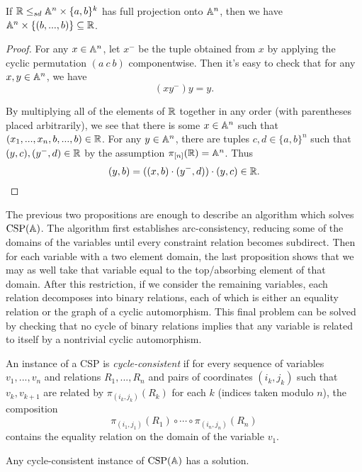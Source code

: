 \documentclass[letterpaper,11pt]{article}
\DeclareMathOperator{\CSP}{CSP}
\begin{document}
\begin{prop}\label{rps-absorb} If $\mathbb{R} \le_{sd} \mathbb{A}^n\times \{a,b\}^k$ has full projection onto $\mathbb{A}^n$, then we have $\mathbb{A}^n\times \{(b,...,b)\} \subseteq \mathbb{R}$.
\end{prop}
\begin{proof} For any $x \in \mathbb{A}^n$, let $x^-$ be the tuple obtained from $x$ by applying the cyclic permutation $(a\ c\ b)$ componentwise. Then it's easy to check that for any $x,y \in \mathbb{A}^n$, we have
\[
(xy^-)y = y.
\]

By multiplying all of the elements of $\mathbb{R}$ together in any order (with parentheses placed arbitrarily), we see that there is some $x \in \mathbb{A}^n$ such that $(x_1, ..., x_n, b, ..., b) \in \mathbb{R}$. For any $y \in \mathbb{A}^n$, there are tuples $c,d \in \{a,b\}^n$ such that $(y,c), (y^-,d) \in \mathbb{R}$ by the assumption $\pi_{[n]}(\mathbb{R}) = \mathbb{A}^n$. Thus
\[
(y,b) = ((x,b)\cdot(y^{-},d))\cdot (y,c) \in \mathbb{R}.\qedhere
\]
\end{proof}

The previous two propositions are enough to describe an algorithm which solves $\CSP(\bA)$. The algorithm first establishes arc-consistency, reducing some of the domains of the variables until every constraint relation becomes subdirect. Then for each variable with a two element domain, the last proposition shows that we may as well take that variable equal to the top/absorbing element of that domain. After this restriction, if we consider the remaining variables, each relation decomposes into binary relations, each of which is either an equality relation or the graph of a cyclic automorphism. This final problem can be solved by checking that no cycle of binary relations implies that any variable is related to itself by a nontrivial cyclic automorphism.

\begin{defn} An instance of a CSP is \emph{cycle-consistent} if for every sequence of variables $v_1, ..., v_n$ and relations $R_1, ..., R_n$ and pairs of coordinates $(i_k,j_k)$ such that $v_k, v_{k+1}$ are related by $\pi_{(i_k,j_k)}(R_k)$ for each $k$ (indices taken modulo $n$), the composition
\[
\pi_{(i_1,j_1)}(R_1) \circ \cdots \circ \pi_{(i_n,j_n)}(R_n)
\]
contains the equality relation on the domain of the variable $v_1$.
\end{defn}

\begin{cor} Any cycle-consistent instance of $\CSP(\bA)$ has a solution.
\end{cor}
\end{document}
